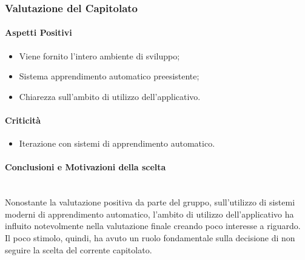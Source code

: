 \subsubsection{Valutazione del Capitolato}

\paragraph{Aspetti Positivi}
\begin{itemize}
	\item Viene fornito l'intero ambiente di sviluppo;
	\item Sistema apprendimento automatico preesistente;
	\item Chiarezza sull'ambito di utilizzo dell'applicativo.
\end{itemize}

\paragraph{Criticità}
\begin{itemize}
	\item Iterazione con sistemi di apprendimento automatico.
\end{itemize}

\paragraph{Conclusioni e Motivazioni della scelta} \-\\
Nonostante la valutazione positiva da parte del gruppo, sull'utilizzo di sistemi moderni di apprendimento automatico, l'ambito di utilizzo dell'applicativo ha influito notevolmente nella valutazione finale creando poco interesse a riguardo.\\
Il poco stimolo, quindi, ha avuto un ruolo fondamentale sulla decisione di non seguire la scelta del corrente capitolato.